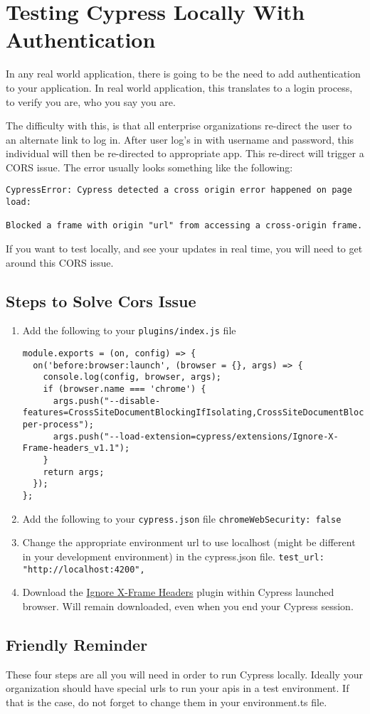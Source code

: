 \chapter{ Testing Cypress Locally With Authentication }

In any real world application, there is going to be the need to add authentication to your application. In real world application, this translates to a login process, to verify you are, who you say you are. 

The difficulty with this, is that all enterprise organizations re-direct the user to an alternate link to log in. After user log's in with username and password, this individual will then be re-directed to appropriate app. This re-direct will trigger a CORS issue. The error usually looks something like the following: 
\begin{verbatim}
CypressError: Cypress detected a cross origin error happened on page load:

Blocked a frame with origin "url" from accessing a cross-origin frame.
\end{verbatim}

If you want to test locally, and see your updates in real time, you will need to get around this CORS issue. 

\section{Steps to Solve Cors Issue}
\begin{enumerate}
\item Add the following to your \lstinline{plugins/index.js} file
\begin{lstlisting}   
module.exports = (on, config) => {
  on('before:browser:launch', (browser = {}, args) => {
    console.log(config, browser, args);
    if (browser.name === 'chrome') {
      args.push("--disable-features=CrossSiteDocumentBlockingIfIsolating,CrossSiteDocumentBlockingAlways,IsolateOrigins,site-per-process");
      args.push("--load-extension=cypress/extensions/Ignore-X-Frame-headers_v1.1");
    }
    return args;
  });
};
\end{lstlisting}   
\item Add the following to your \lstinline{cypress.json} file
\lstinline{chromeWebSecurity: false}
\item Change the appropriate environment url to use localhost (might be different in your development environment) in the cypress.json file.
\lstinline{test_url: "http://localhost:4200",} 
\item Download the \href{http://chrome.google.com/webstore/detail/ignore-x-frame-headers/gleekbfjekiniecknbkamfmkohkpodhe}{Ignore X-Frame Headers} plugin within Cypress launched browser. Will remain downloaded, even when you end your Cypress session. 
\end{enumerate}

\section{Friendly Reminder}
These four steps are all you will need in order to run Cypress locally. Ideally your organization should have special urls to run your apis in a test environment. If that is the case, do not forget to change them in your environment.ts file. 


